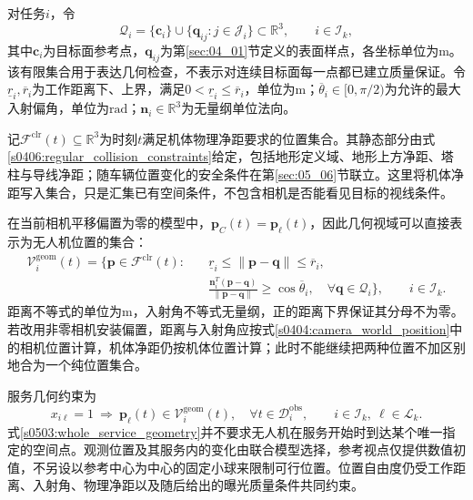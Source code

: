 对任务$i$，令
\begin{equation}
 \mathcal Q_i=\{\mathbf c_i\}\cup
 \{\mathbf q_{ij}:j\in\mathcal J_i\}\subset\mathbb R^3,
 \qquad i\in\mathcal I_k,
 \label{s0503:geometric_target_points}
\end{equation}
其中$\mathbf c_i$为目标面参考点，$\mathbf q_{ij}$为第\ref{sec:04_01}节定义的表面样点，各坐标单位为$\mathrm m$。该有限集合用于表达几何检查，不表示对连续目标面每一点都已建立质量保证。令$\underline r_i,\overline r_i$为工作距离下、上界，满足$0<\underline r_i\le\overline r_i$，单位为$\mathrm m$；$\overline\theta_i\in[0,\pi/2)$为允许的最大入射偏角，单位为$\mathrm{rad}$；$\mathbf n_i\in\mathbb R^3$为无量纲单位法向。

记$\mathcal F^{\mathrm{clr}}(t)\subseteq\mathbb R^3$为时刻$t$满足机体物理净距要求的位置集合。其静态部分由式\eqref{s0406:regular_collision_constraints}给定，包括地形定义域、地形上方净距、塔柱与导线净距；随车辆位置变化的安全条件在第\ref{sec:05_06}节联立。这里将机体净距写入集合，只是汇集已有空间条件，不包含相机是否能看见目标的视线条件。

在当前相机平移偏置为零的模型中，$\mathbf p_C(t)=\mathbf p_\ell(t)$，因此几何视域可以直接表示为无人机位置的集合：
\begin{equation}
 \begin{split}
 \mathcal V_i^{\mathrm{geom}}(t)
 =\biggl\{\mathbf p\in\mathcal F^{\mathrm{clr}}(t):\quad
 &\underline r_i\le\|\mathbf p-\mathbf q\|
      \le\overline r_i,\\
 &\frac{\mathbf n_i^T(\mathbf p-\mathbf q)}
             {\|\mathbf p-\mathbf q\|}
      \ge\cos\overline\theta_i,
 \quad\forall\mathbf q\in\mathcal Q_i\biggr\},
 \qquad i\in\mathcal I_k.
 \end{split}
 \label{s0503:geometric_view_set}
\end{equation}
距离不等式的单位为$\mathrm m$，入射角不等式无量纲，正的距离下界保证其分母不为零。若改用非零相机安装偏置，距离与入射角应按式\eqref{s0404:camera_world_position}中的相机位置计算，机体净距仍按机体位置计算；此时不能继续把两种位置不加区别地合为一个纯位置集合。

服务几何约束为
\begin{equation}
 x_{i\ell}=1\ \Longrightarrow\
 \mathbf p_\ell(t)\in\mathcal V_i^{\mathrm{geom}}(t),
 \quad\forall t\in\mathcal D_i^{\mathrm{obs}},
 \qquad i\in\mathcal I_k,\ \ell\in\mathcal L_k.
 \label{s0503:whole_service_geometry}
\end{equation}
式\eqref{s0503:whole_service_geometry}并不要求无人机在服务开始时到达某个唯一指定的空间点。观测位置及其服务内的变化由联合模型选择，参考视点仅提供数值初值，不另设以参考中心为中心的固定小球来限制可行位置。位置自由度仍受工作距离、入射角、物理净距以及随后给出的曝光质量条件共同约束。

